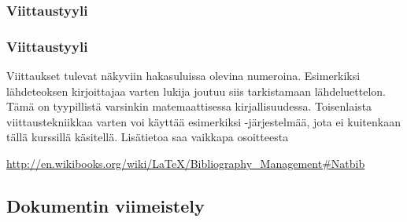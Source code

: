 
%
\subsubsection{Viittaustyyli}
\begin{fframe}
    \frametitle{Viittaustyyli}
    Viittaukset tulevat näkyviin hakasuluissa olevina numeroina. Esimerkiksi lähdeteoksen kirjoittajaa varten lukija joutuu siis tarkistamaan lähdeluettelon. Tämä on tyypillistä varsinkin matemaattisessa kirjallisuudessa. 
    \vaihto
    Toisenlaista viittaustekniikkaa varten voi käyttää esimerkiksi -järjestelmää, jota ei kuitenkaan tällä kurssillä käsitellä. Lisätietoa saa vaikkapa osoitteesta
    \begin{scriptsize}
        \url{http://en.wikibooks.org/wiki/LaTeX/Bibliography_Management#Natbib}
    \end{scriptsize}
\end{fframe}


\subsection{Dokumentin viimeistely}

